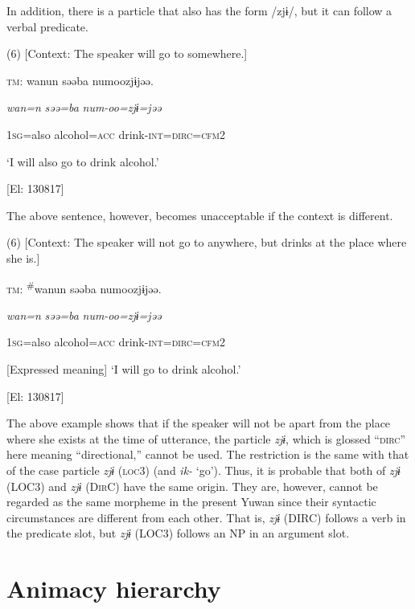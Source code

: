   In addition, there is a particle that also has the form /zjɨ/, but it can follow a verbal predicate.

(6)  [Context: The speaker will go to somewhere.]

  \textsc{tm}:  wanun  səəba  numoozjɨjəə.

    \textit{wan=n}  \textit{səə=ba}  \textit{num-oo=zjɨ=jəə}

    1\textsc{sg}=also  alcohol=\textsc{acc}  drink-\textsc{int}=\textsc{dirc}=\textsc{cfm}2

    ‘I will also go to drink alcohol.’

    [El: 130817]

The above sentence, however, becomes unacceptable if the context is different.

(6)  [Context: The speaker will not go to anywhere, but drinks at the place where she is.]

  \textsc{tm}:  \textsuperscript{\#}wanun  səəba  numoozjɨjəə.

    \textit{wan=n}  \textit{səə=ba}  \textit{num-oo=zjɨ=jəə}

    1\textsc{sg}=also  alcohol=\textsc{acc}  drink-\textsc{int}=\textsc{dirc}=\textsc{cfm}2

    [Expressed meaning] ‘I will go to drink alcohol.’

    [El: 130817]

The above example shows that if the speaker will not be apart from the place where she exists at the time of utterance, the particle \textit{zjɨ}, which is glossed “\textsc{dirc}” here meaning “directional,” cannot be used. The restriction is the same with that of the case particle \textit{zjɨ} (\textsc{loc}3) (and \textit{ik-} ‘go’). Thus, it is probable that both of \textit{zjɨ} (LOC3) and \textit{zjɨ} (D\textsc{ir}C) have the same origin. They are, however, cannot be regarded as the same morpheme in the present Yuwan since their syntactic circumstances are different from each other. That is, \textit{zjɨ} (DIRC) follows a verb in the predicate slot, but \textit{zjɨ} (LOC3) follows an NP in an argument slot.

\section{Animacy hierarchy}

